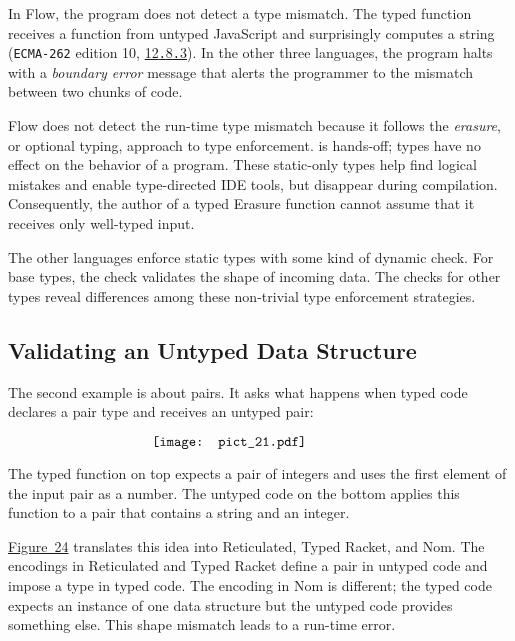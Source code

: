 \documentclass[ twoside,open=right,titlepage,numbers=noenddot,headinclude,%
                footinclude=true,cleardoublepage=empty,abstract=off,
                BCOR=5mm,paper=a4,fontsize=11pt,%
                ngerman,american,%
                parts,pdfspacing]{scrreprt}
\newcommand{\Scribtexttt}[1]{{\texttt{#1}}}
\newcommand{\Ssubsubsection}[2]{\subsubsection[#1]{#2}}
\newcommand{\Shref}[3]{\href{#1\##2}{#3}}
\newcommand{\FigureRef}[2]{#1}
\renewcommand{\Ssubsubsection}[2]{\subsection[#1]{#2}}
\begin{document}
In Flow, the program does not detect a type mismatch.
The typed function receives a function from untyped JavaScript and surprisingly computes a string
 (\Scribtexttt{ECMA{-}262} edition 10, \relax{\S} \Shref{https://www.ecma-international.org/ecma-262/}{sec-addition-operator-plus}{12{\hbox{\texttt{.}}}8{\hbox{\texttt{.}}}3}).
In the other three languages, the program halts with
a \emph{boundary error} message that alerts the programmer to the
 mismatch between two chunks of code.

Flow does not detect the run{-}time type mismatch because it follows the
 \emph{erasure}, or optional typing, approach to type enforcement.
\relax{\ename} is hands{-}off;
 types have no effect on the behavior of a program.
These static{-}only types help find logical mistakes and enable type{-}directed IDE tools,
 but disappear during compilation.
Consequently, the author of a typed Erasure function cannot assume that it
 receives only well{-}typed input.

The other languages enforce static types with some kind of dynamic check.
For base types, the check validates the shape of incoming data.
The checks for other types reveal differences among these non{-}trivial type enforcement strategies.

\Ssubsubsection{Validating an Untyped Data Structure}{Validating an Untyped Data Structure}\label{t:x28part_x22secx3adesignx3aantix2dconcretex22x29}

The second example is about pairs. It asks what
 happens when typed code declares a pair type and receives an untyped pair:

\begin{equation}\label{eq:example-pair}\raisebox{-0.20000000000000284bp}{\makebox[153.6bp][l]{\texttt{[image: pict\_21.pdf]}}}\end{equation}

\noindent{}The typed function on top expects a pair of integers and uses the
 first element of the input pair as a number.
The untyped code on the bottom applies this function to a pair that contains a
 string and an integer.

\hyperref[t:x28counter_x28x22figurex22_x22figx3aexamplex2dpairx22x29x29]{Figure~\FigureRef{24}{t:x28counter_x28x22figurex22_x22figx3aexamplex2dpairx22x29x29}} translates this idea into
 Reticulated, Typed Racket, and Nom.
The encodings in Reticulated and Typed Racket
 define a pair in untyped code and impose a type in typed code.
The encoding in Nom is different;
 the typed code expects an instance of one data structure but
 the untyped code provides something else.
This shape mismatch leads to a run{-}time error.
\end{document}

